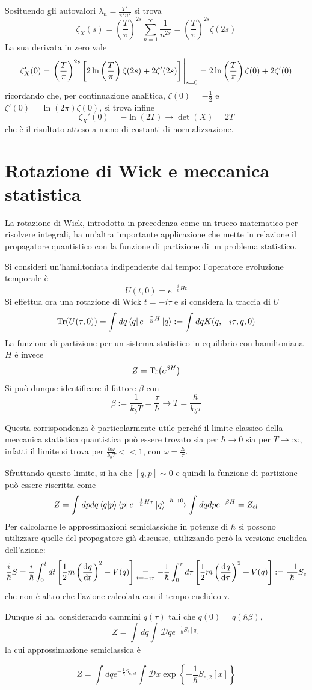 Sosituendo gli autovalori $\lambda_n=\frac{T^2}{\pi^2n^2}$ si trova
$$\zeta_X(s) = \left(\frac{T}{\pi}\right)^{2s}\sum_{n=1}^{\infty}\frac{1}{n^{2s}} =
\left(\frac{T}{\pi}\right)^{2s}\zeta(2s)$$
La sua derivata in zero vale
$$\zeta_X'(0) =\eval{ \left(\frac{T}{\pi}\right)^{2s}\left[2\ln\left(\frac{T}{\pi}\right)\zeta(2s)+2\zeta'(2s)
\right]}_{s=0} = 2\ln\left(\frac{T}{\pi}\right)\zeta(0) + 2\zeta'(0)$$
ricordando che, per continuazione analitica, $\zeta(0) = -\frac{1}{2}$ e $\zeta'(0) = \ln(2\pi)\zeta(0)$,
si trova infine
$$\zeta_X'(0) = -\ln(2T)\rightarrow\det(X) = 2T$$
che è il risultato atteso a meno di costanti di normalizzazione.
\section{Rotazione di Wick e meccanica statistica}
La rotazione di Wick, introdotta in precedenza come un trucco matematico per risolvere integrali,
ha un'altra importante applicazione che mette in relazione il propagatore quantistico con la funzione
di partizione di un problema statistico.

Si consideri un'hamiltoniata indipendente dal tempo: l'operatore evoluzione temporale è
$$U(t,0) = e^{-\frac{i}{\hbar}Ht}$$
Si effettua ora una rotazione di Wick $t=-i\tau$ e si considera la traccia di $U$
$$\Tr(U(\tau,0)) = \int_{}^{}dq\bra{q}e^{-\frac{\tau}{\hbar}H}\ket{q} := \int_{}^{}dqK(q,-i\tau,q,0)$$	
La funzione di partizione per un sistema statistico in equilibrio con hamiltoniana $H$ è invece
$$Z = \Tr(e^{\beta H})$$
Si può dunque identificare il fattore $\beta$ con
$$\beta := \frac{1}{k_bT} = \frac{\tau}{\hbar}\rightarrow T =\frac{\hbar}{k_b\tau}$$

Questa corrispondenza è particolarmente utile perché il limite classico della meccanica statistica
quantistica può essere trovato sia per $\hbar\to0$ sia per $T\to\infty$, infatti il limite si trova
per $\frac{\hbar \omega}{k_bT}<<1$, con $\omega=\frac{E}{\tau}$.

Sfruttando questo limite, si ha che $[q,p]\sim0$ e quindi la funzione di partizione può essere
riscritta come
$$Z = \int_{}^{}dpdq\bra{q}\ket{p}\bra{p}e^{-\frac{1}{\hbar}H\tau}\ket{q}\xrightarrow{\hbar\to0}
\int_{}^{}dqdpe^{-\beta H} = Z_{cl}$$
Per calcolarne le approssimazioni semiclassiche in potenze di $\hbar$ si possono utilizzare quelle del
propagatore già discusse, utilizzando però la versione euclidea dell'azione:
$$\frac{i}{\hbar}S = \frac{i}{\hbar}\int_{0}^{t}dt\left[\frac{1}{2}m\left(\dv[]{q}{t}\right)^2-V(q)
\right] \underset{t=-i\tau}= -\frac{1}{\hbar}\int_{0}^{\tau}d\tau\left[\frac{1}{2}m\left(\dv[]{q}{\tau}
\right)^2+V(q)\right]:=\frac{-1}{\hbar}S_e$$
che non è altro che l'azione calcolata con il tempo euclideo $\tau$.

Dunque si ha, considerando cammini $q(\tau)$ tali che $q(0)=q(\hbar\beta)$,
$$Z = \int_{}^{}dq\int_{}^{}\mathcal{D}qe^{-\frac{1}{\hbar}S_e[q]}$$
la cui approssimazione semiclassica è

$$Z = \int_{}^{}dqe^{-\frac{1}{\hbar}S_{e,cl}}\int_{}^{}\mathcal{D}x\exp\left\{-\frac{1}{\hbar}S_{e,2}[x]
\right\}$$
